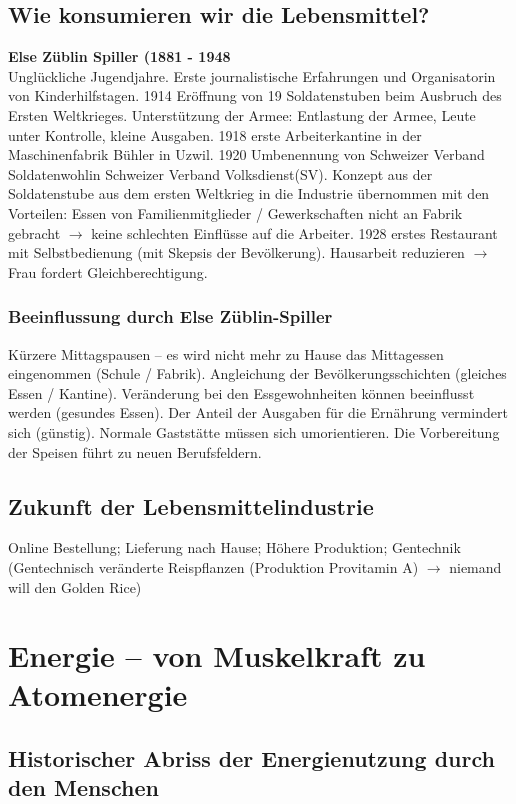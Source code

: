 \documentclass[10pt, openright=true]{scrartcl}
\begin{document}
\subsection{Wie konsumieren wir die Lebensmittel?}
\textbf{Else Züblin Spiller (1881 - 1948}\\
Unglückliche Jugendjahre. Erste journalistische Erfahrungen und Organisatorin von Kinderhilfstagen. 1914 Eröffnung von 19 Soldatenstuben beim Ausbruch des Ersten Weltkrieges. Unterstützung der Armee: Entlastung der Armee, Leute unter Kontrolle, kleine Ausgaben. 1918 erste Arbeiterkantine in der Maschinenfabrik Bühler in Uzwil. 1920 Umbenennung von \glqq Schweizer Verband Soldatenwohl\grqq in \glqq Schweizer Verband Volksdienst\grqq (SV). Konzept aus der Soldatenstube aus dem ersten Weltkrieg in die Industrie übernommen mit den Vorteilen: Essen von Familienmitglieder / Gewerkschaften nicht an Fabrik gebracht $ \rightarrow $ keine schlechten Einflüsse auf die Arbeiter. 1928 erstes Restaurant mit Selbstbedienung (mit Skepsis der Bevölkerung). Hausarbeit reduzieren $ \rightarrow $ Frau fordert Gleichberechtigung.
\subsubsection{Beeinflussung durch Else Züblin-Spiller}
Kürzere Mittagspausen – es wird nicht mehr zu Hause das Mittagessen eingenommen (Schule / Fabrik). Angleichung der Bevölkerungsschichten (gleiches Essen / Kantine). Veränderung bei den Essgewohnheiten können beeinflusst werden (gesundes Essen). Der Anteil der Ausgaben für die Ernährung vermindert sich (günstig). Normale Gaststätte müssen sich umorientieren. Die Vorbereitung der Speisen führt zu neuen Berufsfeldern. 
\subsection{Zukunft der Lebensmittelindustrie}
Online Bestellung; Lieferung nach Hause; Höhere Produktion; Gentechnik (Gentechnisch veränderte Reispflanzen (Produktion Provitamin A) $ \rightarrow $ niemand will den Golden Rice)
\section{Energie – von Muskelkraft zu Atomenergie}
\subsection{Historischer Abriss der Energienutzung durch den Menschen}
\end{document}
